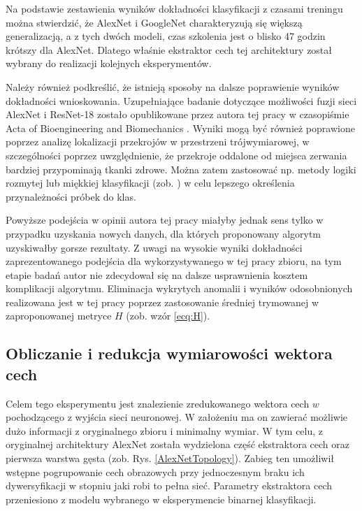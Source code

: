Na podstawie zestawienia wyników dokładności klasyfikacji z czasami treningu można stwierdzić, że AlexNet i GoogleNet charakteryzują się większą generalizacją, a z tych dwóch modeli, czas szkolenia jest o blisko 47 godzin krótszy dla AlexNet. Dlatego właśnie ekstraktor cech tej architektury został wybrany do realizacji kolejnych eksperymentów. 

Należy również podkreślić, że istnieją sposoby na dalsze poprawienie wyników dokładności wnioskowania. Uzupełniające badanie dotyczące możliwości fuzji sieci AlexNet i ResNet-18 zostało opublikowane przez autora tej pracy w czasopiśmie Acta of Bioengineering and Biomechanics \cite{Kapinski19}. Wyniki mogą być również poprawione poprzez analizę lokalizacji przekrojów w przestrzeni trójwymiarowej, w szczególności poprzez uwzględnienie, że przekroje oddalone od miejsca zerwania bardziej przypominają tkanki zdrowe. Można zatem zastosować np. metody logiki rozmytej lub miękkiej klasyfikacji (zob. \cite{Liu2011}) w celu lepszego określenia przynależności próbek do klas. 

Powyższe podejścia w opinii autora tej pracy miałyby jednak sens tylko w przypadku uzyskania nowych danych, dla których proponowany algorytm uzyskiwałby gorsze rezultaty. Z uwagi na wysokie wyniki dokładności zaprezentowanego podejścia dla wykorzystywanego w tej pracy zbioru, na tym etapie badań autor nie zdecydował się na dalsze usprawnienia kosztem komplikacji algorytmu. Eliminacja wykrytych anomalii i wyników odosobnionych realizowana jest w tej pracy poprzez zastosowanie średniej trymowanej w zaproponowanej metryce $H$ (zob. wzór \ref{ecq:H}).

\subsection{Obliczanie i redukcja wymiarowości wektora cech}

Celem tego eksperymentu jest znalezienie zredukowanego wektora cech $w$ pochodzącego z wyjścia sieci neuronowej. W założeniu ma on zawierać możliwie dużo informacji z oryginalnego zbioru i minimalny wymiar. W tym celu, z oryginalnej architektury AlexNet została wydzielona część ekstraktora cech oraz pierwsza warstwa gęsta (zob. Rys. \ref{AlexNetTopology}). Zabieg ten umożliwił wstępne pogrupowanie cech obrazowych przy jednoczesnym braku ich dywersyfikacji w stopniu jaki robi to pełna sieć. Parametry ekstraktora cech przeniesiono z modelu wybranego w eksperymencie binarnej klasyfikacji. 

